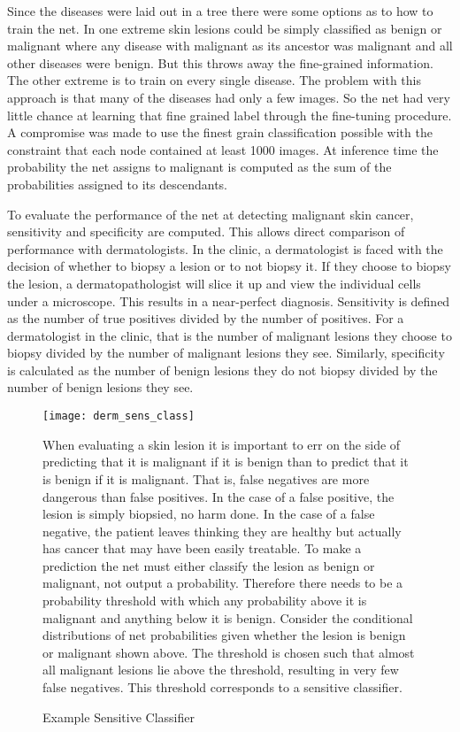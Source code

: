 Since the diseases were laid out in a tree there were some options as to how to train the net.  In one extreme skin lesions could be simply classified as benign or malignant where any disease with malignant as its ancestor was malignant and all other diseases were benign.  But this throws away the fine-grained information.  The other extreme is to train on every single disease.  The problem with this approach is that many of the diseases had only a few images.  So the net had very little chance at learning that fine grained label through the fine-tuning procedure.  A compromise was made to use the finest grain classification possible with the constraint that each node contained at least 1000 images.  At inference time the probability the net assigns to malignant is computed as the sum of the probabilities assigned to its descendants.

To evaluate the performance of the net at detecting malignant skin cancer, sensitivity and specificity are computed.  This allows direct comparison of performance with dermatologists.  In the clinic, a dermatologist is faced with the decision of whether to biopsy a lesion or to not biopsy it.  If they choose to biopsy the lesion, a dermatopathologist will slice it up and view the individual cells under a microscope.  This results in a near-perfect diagnosis.  Sensitivity is defined as the number of true positives divided by the number of positives.  For a dermatologist in the clinic, that is the number of malignant lesions they choose to biopsy divided by the number of malignant lesions they see.  Similarly, specificity is calculated as the number of benign lesions they do not biopsy divided by the number of benign lesions they see.

\begin{figure}
\texttt{[image: derm\_sens\_class]}
\caption{Example Sensitive Classifier}
\vspace{12px}
When evaluating a skin lesion it is important to err on the side of predicting that it is malignant if it is benign than to predict that it is benign if it is malignant.  That is, false negatives are more dangerous than false positives.  In the case of a false positive, the lesion is simply biopsied, no harm done.  In the case of a false negative, the patient leaves thinking they are healthy but actually has cancer that may have been easily treatable.  To make a prediction the net must either classify the lesion as benign or malignant, not output a probability.  Therefore there needs to be a probability threshold with which any probability above it is malignant and anything below it is benign.  Consider the conditional distributions of net probabilities given whether the lesion is benign or malignant shown above.  The threshold is chosen such that almost all malignant lesions lie above the threshold, resulting in very few false negatives.  This threshold corresponds to a sensitive classifier.
\vspace{12px}
\label{fig:derm_sens_class}
\end{figure}

